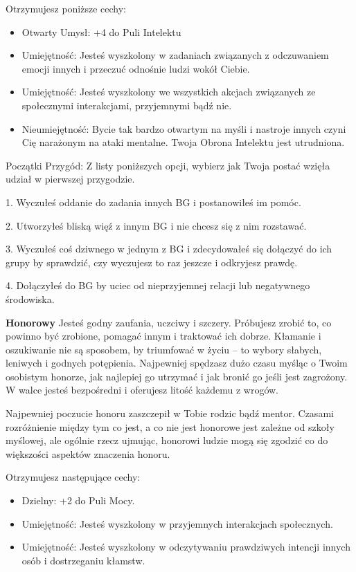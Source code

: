 Otrzymujesz poniższe cechy:
\begin{itemize}
\item Otwarty Umysł: +4 do Puli Intelektu
\item Umiejętność: Jesteś wyszkolony w zadaniach związanych z odczuwaniem emocji innych i przeczuć odnośnie ludzi wokół Ciebie.
\item Umiejętność: Jesteś wyszkolony we wszystkich akcjach związanych ze społecznymi interakcjami, przyjemnymi bądź nie.
\item Nieumiejętność: Bycie tak bardzo otwartym na myśli i nastroje innych czyni Cię narażonym na ataki mentalne. Twoja Obrona Intelektu jest utrudniona.
\end{itemize}

Początki Przygód: Z listy poniższych opcji, wybierz jak Twoja postać wzięła udział w pierwszej przygodzie.

1. Wyczułeś oddanie do zadania innych BG i postanowiłeś im pomóc.

2. Utworzyłeś bliską więź z innym BG i nie chcesz się z nim rozstawać.

3. Wyczułeś coś dziwnego w jednym z BG i zdecydowałeś się dołączyć do ich grupy by sprawdzić, czy wyczujesz to raz jeszcze i odkryjesz prawdę.

4. Dołączyłeś do BG by uciec od nieprzyjemnej relacji lub negatywnego środowiska. 

\textbf{Honorowy}
Jesteś godny zaufania, uczciwy i szczery. Próbujesz zrobić to, co powinno być zrobione, pomagać innym i traktować ich dobrze. Kłamanie i oszukiwanie nie są sposobem, by triumfować w życiu – to wybory słabych, leniwych i godnych potępienia. Najpewniej spędzasz dużo czasu myśląc o Twoim osobistym honorze, jak najlepiej go utrzymać i jak bronić go jeśli jest zagrożony. W walce jesteś bezpośredni i oferujesz litość każdemu z wrogów.

Najpewniej poczucie honoru zaszczepił w Tobie rodzic bądź mentor. Czasami rozróżnienie między tym co jest, a co nie jest honorowe jest zależne od szkoły myślowej, ale ogólnie rzecz ujmując, honorowi ludzie mogą się zgodzić co do większości aspektów znaczenia honoru.

Otrzymujesz następujące cechy:
\begin{itemize}
\item Dzielny: +2 do Puli Mocy.
\item Umiejętność: Jesteś wyszkolony w przyjemnych interakcjach społecznych.
\item Umiejętność: Jesteś wyszkolony w odczytywaniu prawdziwych intencji innych osób i dostrzeganiu kłamstw.
\end{itemize}
    
